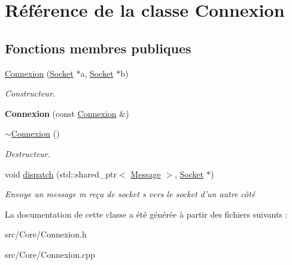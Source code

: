 \hypertarget{classConnexion}{\section{Référence de la classe Connexion}
\label{classConnexion}
}
\subsection*{Fonctions membres publiques}
\begin{DoxyCompactItemize}
\item 
\hypertarget{classConnexion_a31fda5acfafb5ec2de7ae76cfce373a7}{\hyperlink{classConnexion_a31fda5acfafb5ec2de7ae76cfce373a7}{Connexion} (\hyperlink{classSocket}{Socket} $\ast$a, \hyperlink{classSocket}{Socket} $\ast$b)}\label{classConnexion_a31fda5acfafb5ec2de7ae76cfce373a7}

\begin{DoxyCompactList}\small\item\em Constructeur. \end{DoxyCompactList}\item 
\hypertarget{classConnexion_a72dc9b8799eed7b02b7e75e8bccb601c}{{\bfseries Connexion} (const \hyperlink{classConnexion}{Connexion} \&)}\label{classConnexion_a72dc9b8799eed7b02b7e75e8bccb601c}

\item 
\hypertarget{classConnexion_a6afee761c33e160c2be5e9e2713968e3}{\hyperlink{classConnexion_a6afee761c33e160c2be5e9e2713968e3}{$\sim$\-Connexion} ()}\label{classConnexion_a6afee761c33e160c2be5e9e2713968e3}

\begin{DoxyCompactList}\small\item\em Destructeur. \end{DoxyCompactList}\item 
\hypertarget{classConnexion_a0f7bc822c79457f13d411e946948959c}{void \hyperlink{classConnexion_a0f7bc822c79457f13d411e946948959c}{dispatch} (std\-::shared\-\_\-ptr$<$ \hyperlink{classMessage}{Message} $>$, \hyperlink{classSocket}{Socket} $\ast$)}\label{classConnexion_a0f7bc822c79457f13d411e946948959c}

\begin{DoxyCompactList}\small\item\em Envoye un message m reçu de socket s vers le socket d'un autre côté \end{DoxyCompactList}\end{DoxyCompactItemize}


La documentation de cette classe a été générée à partir des fichiers suivants \-:\begin{DoxyCompactItemize}
\item 
src/\-Core/Connexion.\-h\item 
src/\-Core/Connexion.\-cpp\end{DoxyCompactItemize}
